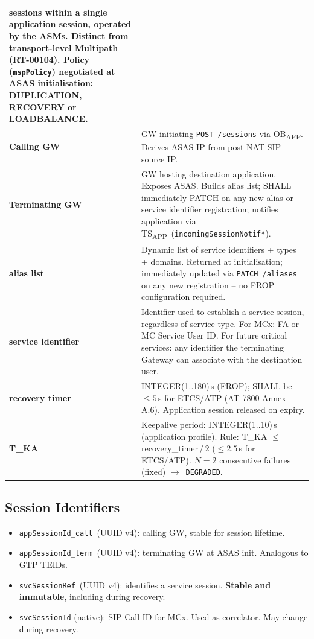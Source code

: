 \documentclass[11pt,a4paper]{article}
\newcommand{\OBAPP}{OB\textsubscript{APP}}
\newcommand{\TSAPP}{TS\textsubscript{APP}}
\newcommand{\arr}{$\to$}
\newcommand{\svcref}{\texttt{svcSessionRef}}
\newcommand{\appcall}{\texttt{appSessionId\_call}}
\newcommand{\appterm}{\texttt{appSessionId\_term}}
\begin{document}
\begin{longtable}{>{\bfseries}p{3.8cm} p{10.5cm}}
    sessions within a single application session, operated by the ASMs. Distinct from
    transport-level Multipath (RT-00104). Policy (\texttt{mspPolicy}) negotiated at
    ASAS initialisation: DUPLICATION, RECOVERY or LOADBALANCE. \\[0.3em]
  Calling GW & GW initiating \texttt{POST /sessions} via \OBAPP.
    Derives ASAS IP from post-NAT SIP source IP. \\[0.3em]
  Terminating GW & GW hosting destination application. Exposes ASAS. Builds alias
    list; SHALL immediately PATCH on any new alias or service identifier registration;
    notifies application via \TSAPP\ (\texttt{incomingSessionNotif*}). \\[0.3em]
  alias list & Dynamic list of service identifiers + types + domains.
    Returned at initialisation; immediately updated via \texttt{PATCH /aliases}
    on any new registration -- no FROP configuration required. \\[0.3em]
  service identifier & Identifier used to establish a service session, regardless
    of service type. For MCx: FA or MC Service User ID. For future critical services:
    any identifier the terminating Gateway can associate with the destination user. \\[0.3em]
  recovery timer & INTEGER(1..180)\,s (FROP); SHALL be $\leq 5$\,s for ETCS/ATP
    (AT-7800 Annex A.6). Application session released on expiry. \\[0.3em]
  T\_KA & Keepalive period: INTEGER(1..10)\,s (application profile).
    Rule: T\_KA $\leq$ recovery\_timer\,/\,2 ($\leq 2.5$\,s for ETCS/ATP).
    $N = 2$ consecutive failures (fixed) \arr\ \texttt{DEGRADED}. \\
  \bottomrule
\end{longtable}

\subsection{Session Identifiers}

\begin{itemize}[leftmargin=2em]
  \item \appcall\ (UUID v4): calling GW, stable for session lifetime.
  \item \appterm\ (UUID v4): terminating GW at ASAS init. Analogous to GTP TEIDs.
  \item \svcref\ (UUID v4): identifies a service session. \textbf{Stable and immutable},
    including during recovery.
  \item \texttt{svcSessionId} (native): SIP Call-ID for MCx. Used as correlator.
    May change during recovery.
\end{itemize}
\end{document}
